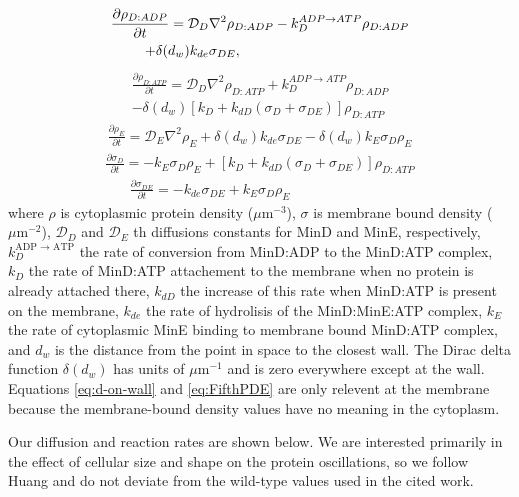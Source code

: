 \documentclass[letterpaper,twocolumn,amsmath,amssymb,pre]{revtex4-1}
\newcommand\micron{\ensuremath{\mu\text{m}}}
\begin{document}
\begin{multline}
  \frac{\partial \rho_{D:ADP}}{\partial t} = \mathcal{D}_D\nabla^2\rho_{D:ADP}-k_D^{ADP\rightarrow ATP}\rho_{D:ADP}\\
  +\delta(d_w)k_{de}\sigma_{DE},\hspace{3.4cm}
\end{multline}
\begin{multline}
  \frac{\partial \rho_{D:ATP}}{\partial t} = \mathcal{D}_D\nabla^2\rho_{D:ATP}+k_D^{ADP\rightarrow ATP}\rho_{D:ADP}\\
  -\delta(d_w)[k_D+k_{dD}(\sigma_D+\sigma_{DE})]\rho_{D:ATP}
\end{multline}
\begin{multline}
  \frac{\partial \rho_E}{\partial t} = \mathcal{D}_E\nabla^2\rho_E+\delta(d_w)k_{de}\sigma_{DE}
  -\delta(d_w)k_E \sigma_D \rho_E
\end{multline}
\begin{multline}
  \frac{\partial \sigma_D}{\partial t} = -k_E\sigma_D\rho_E
  +[k_D+k_{dD}(\sigma_D+\sigma_{DE})]\rho_{D:ATP}
  \label{eq:d-on-wall}
\end{multline}
\begin{multline}
  \frac{\partial \sigma_{DE}}{\partial t} = -k_{de}\sigma_{DE}+k_E\sigma_D\rho_E\hspace{3cm}
  \label{eq:FifthPDE}
\end{multline}
where $\rho$ is cytoplasmic protein density ($\micron^{-3}$), $\sigma$
is membrane bound density ($\micron^{-2}$), $\mathcal{D}_D$ and
$\mathcal{D}_{E}$ th diffusions constants for MinD and MinE,
respectively, $k_D^{\textrm{ADP $\rightarrow$ ATP}}$ the rate of
conversion from MinD:ADP to the MinD:ATP complex, $k_D$ the rate of
MinD:ATP attachement to the membrane when no protein is already
attached there, $k_{dD}$ the increase of this rate when MinD:ATP is
present on the membrane, $k_{de}$ the rate of hydrolisis of the
MinD:MinE:ATP complex, $k_E$ the rate of cytoplasmic MinE binding to
membrane bound MinD:ATP complex, and $d_w$ is the distance from the
point in space to the closest wall.  The Dirac delta function
$\delta(d_w)$ has units of $\micron^{-1}$ and is zero everywhere except
at the wall.  Equations \ref{eq:d-on-wall} and \ref{eq:FifthPDE} are
only relevent at the membrane because the membrane-bound density
values have no meaning in the cytoplasm.

Our diffusion and reaction rates are shown below.  We are interested
primarily in the effect of cellular size and shape on the protein
oscillations, so we follow Huang\cite{huang2003dynamic} and do not
deviate from the wild-type values used in the cited work.
\end{document}
